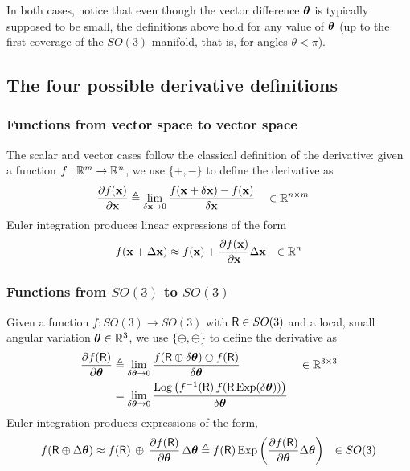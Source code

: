 \bigskip
In both cases, notice that even though the vector difference ${\bm \theta}$ is typically supposed to be small, the definitions above hold for any value of ${\bm \theta}$ (up to the first coverage of the $SO(3)$ manifold, that is, for angles $\theta<\pi$).

\subsection{The four possible derivative definitions}



\subsubsection{Functions from vector space to vector space}

The scalar and vector cases follow the classical definition of the derivative: given a function $f:{\mathbb R}^m\to{\mathbb R}^n$, we use $\{+,-\}$ to define the derivative as
%
\begin{align}
\frac{\partial f({\bf x})}{\partial{\bf x}} &\triangleq \lim_{\delta{\bf x}\to0}\frac{f({\bf x}+\delta{\bf x})-f({\bf x})}{\delta{\bf x}} &&\in {\mathbb R}^{n\times m} \label{equ:derivative_vector}
\end{align}
%
Euler integration produces linear expressions of the form
%
\begin{align*}
f({\bf x}+\Delta{\bf x}) &\approx f({\bf x}) + \frac{\partial f({\bf x})}{\partial{\bf x}}\Delta{\bf x}
& \in {\mathbb R}^n
\end{align*}

\subsubsection{Functions from $SO(3)$ to $SO(3)$}

Given a function $f:SO(3) \to SO(3)$ with $\mathsf R\in SO(3)$ and a local, small angular variation ${\bm \theta}\in{\mathbb R}^3$, we use $\{\oplus,\ominus\}$ to define the derivative as
%
\begin{align}
\frac{\partial f(\mathsf R)}{\partial{\bm \theta}} 
&\triangleq \lim_{\delta{\bm \theta}\to0}\frac{f(\mathsf R\oplus\delta{\bm \theta})\ominus f(\mathsf R)}{\delta{\bm \theta}}  && \in {\mathbb R}^{3\times 3}\\
&= \lim_{\delta{\bm \theta}\to0}\frac{\operatorname*{Log}\big(f^{-1}(\mathsf R)\,f(\mathsf R\operatorname*{Exp}(\delta{\bm \theta}))\big)}{\delta{\bm \theta}} \label{equ:derivative_SO3}
\end{align}
%
Euler integration produces expressions of the form,
%
\begin{align*}
f(\mathsf R\oplus\Delta{\bm \theta}) &\approx f(\mathsf R)\,\oplus\,\frac{\partial f(\mathsf R)}{\partial{\bm \theta}}\,\Delta{\bm \theta}
 \triangleq f(\mathsf R)\operatorname*{Exp}\left(\frac{\partial f(\mathsf R)}{\partial{\bm \theta}}\Delta{\bm \theta}\right)
 & \in SO(3)
\end{align*}





